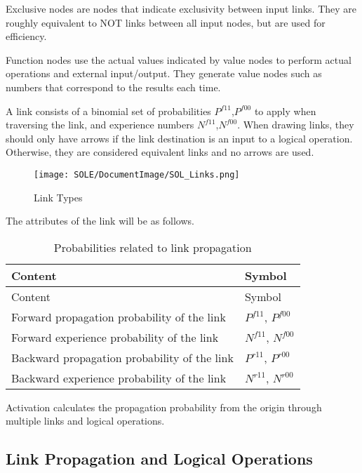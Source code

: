 \documentclass[12pt]{article}
\begin{document}
Exclusive nodes are nodes that indicate exclusivity between input links.
They are roughly equivalent to NOT links between all input nodes, but
are used for efficiency.

Function nodes use the actual values \hspace{0pt}\hspace{0pt}indicated
by value nodes to perform actual operations and external input/output.
They generate value nodes such as numbers that correspond to the results
each time.

A link consists of a binomial set of probabilities
\(P^{f11}\),\(P^{f00}\) to apply when traversing the link, and
experience numbers \(N^{f11}\),\(N^{f00}\). When drawing links, they
should only have arrows if the link destination is an input to a logical
operation. Otherwise, they are considered equivalent links and no arrows
are used.

\begin{figure}[ht]
  \centering
  \texttt{[image: SOLE/DocumentImage/SOL\_Links.png]}
  \caption{Link Types}
  \label{fig:link_types}
\end{figure}

The attributes of the link will be as follows.

\begin{longtable}{@{}p{}p{}@{}}
  \caption{Probabilities related to link propagation} \\
  \toprule
  Content & Symbol \\
  \midrule
  \endfirsthead
  
  \toprule
  Content & Symbol \\
  \midrule
  \endhead
  
  \bottomrule
  \endfoot
  
  Forward propagation probability of the link & \(P^{f11}\), \(P^{f00}\) \\
  Forward experience probability of the link & \(N^{f11}\), \(N^{f00}\) \\
  Backward propagation probability of the link & \(P^{r11}\), \(P^{r00}\) \\
  Backward experience probability of the link & \(N^{r11}\), \(N^{r00}\) \\
\end{longtable}

Activation calculates the propagation probability from
the origin through multiple links and logical operations. 

\subsection{Link Propagation and Logical Operations}\label{link-propagation-and-logical-operations}
\end{document}
